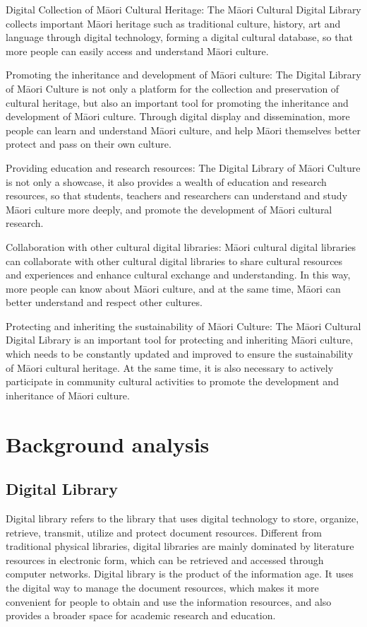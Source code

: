 Digital Collection of Māori Cultural Heritage: The Māori Cultural Digital Library collects important Māori heritage such as traditional culture, history, art and language through digital technology, forming a digital cultural database, so that more people can easily access and understand Māori culture.

Promoting the inheritance and development of Māori culture: The Digital Library of Māori Culture is not only a platform for the collection and preservation of cultural heritage, but also an important tool for promoting the inheritance and development of Māori culture. Through digital display and dissemination, more people can learn and understand Māori culture, and help Māori themselves better protect and pass on their own culture.

Providing education and research resources: The Digital Library of Māori Culture is not only a showcase, it also provides a wealth of education and research resources, so that students, teachers and researchers can understand and study Māori culture more deeply, and promote the development of Māori cultural research.

Collaboration with other cultural digital libraries: Māori cultural digital libraries can collaborate with other cultural digital libraries to share cultural resources and experiences and enhance cultural exchange and understanding. In this way, more people can know about Māori culture, and at the same time, Māori can better understand and respect other cultures.

Protecting and inheriting the sustainability of Māori Culture: The Māori Cultural Digital Library is an important tool for protecting and inheriting Māori culture, which needs to be constantly updated and improved to ensure the sustainability of Māori cultural heritage. At the same time, it is also necessary to actively participate in community cultural activities to promote the development and inheritance of Māori culture.
 
\section{Background analysis}
\subsection{Digital Library}
Digital library refers to the library that uses digital technology to store, organize, retrieve, transmit, utilize and protect document resources. Different from traditional physical libraries, digital libraries are mainly dominated by literature resources in electronic form, which can be retrieved and accessed through computer networks. Digital library is the product of the information age. It uses the digital way to manage the document resources, which makes it more convenient for people to obtain and use the information resources, and also provides a broader space for academic research and education.

